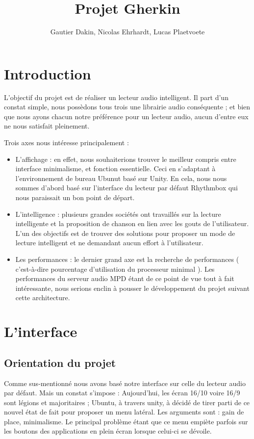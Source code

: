 \documentclass{report}
\author{Gautier Dakin, Nicolas Ehrhardt, Lucas Plaetvoete}
\title{Projet Gherkin}
\begin{document}
\maketitle

\section*{Introduction}
L'objectif du projet est de réaliser un lecteur audio intelligent. Il part d'un constat simple, nous possèdons tous trois une librairie audio conséquente ; et bien que nous ayons chacun notre préférence pour un lecteur audio, aucun d'entre eux ne nous satisfait pleinement.

Trois axes nous intéresse principalement :
\begin{itemize}
\item L'affichage : en effet, nous souhaiterions trouver le meilleur compris entre interface minimalisme, et fonction essentielle. Ceci en s'adaptant à l'environnement de bureau Ubunut basé sur Unity. En cela, nous nous sommes d'abord basé sur l'interface du lecteur par défaut Rhythmbox qui nous paraissait un bon point de départ.

\item L'intelligence : plusieurs grandes sociétés ont travaillés sur la lecture intelligente et la proposition de chanson en lien avec les gouts de l'utilisateur. L'un des objectifs est de trouver des solutions pour proposer un mode de lecture intelligent et ne demandant aucun effort à l'utilisateur.

\item Les performances : le dernier grand axe est la recherche de performances ( c'est-à-dire pourcentage d'utilisation du processeur minimal ). Les performances du serveur audio MPD étant de ce point de vue tout à fait intéressante, nous serions enclin à pousser le développement du projet suivant cette architecture.
\end{itemize}

\section*{L'interface}
\subsection*{Orientation du projet}
Comme sus-mentionné nous avons basé notre interface sur celle du lecteur audio par défaut. Mais un constat s'impose : Aujourd'hui, les écran 16/10 voire 16/9 sont légions et majoritaires ; Ubuntu, à travers unity, à décidé de tirer parti de ce nouvel état de fait pour proposer un menu latéral. Les arguments sont : gain de place, minimalisme. Le principal problème étant que ce menu empiète parfois sur les boutons des applications en plein écran lorsque celui-ci se dévoile.
\end{document}
